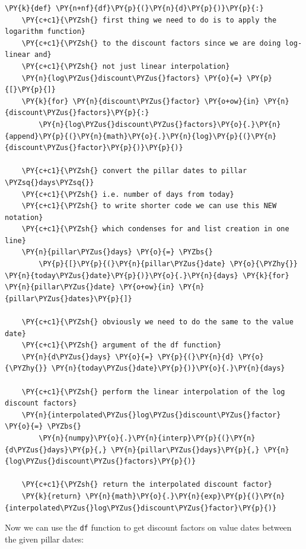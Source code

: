 \begin{tcolorbox}[breakable, size=fbox, boxrule=1pt, pad at break*=1mm,colback=cellbackground, colframe=cellborder]
\begin{Verbatim}[commandchars=\\\{\}]
\PY{k}{def} \PY{n+nf}{df}\PY{p}{(}\PY{n}{d}\PY{p}{)}\PY{p}{:}
    \PY{c+c1}{\PYZsh{} first thing we need to do is to apply the logarithm function}
    \PY{c+c1}{\PYZsh{} to the discount factors since we are doing log-linear and}
    \PY{c+c1}{\PYZsh{} not just linear interpolation}
    \PY{n}{log\PYZus{}discount\PYZus{}factors} \PY{o}{=} \PY{p}{[}\PY{p}{]}
    \PY{k}{for} \PY{n}{discount\PYZus{}factor} \PY{o+ow}{in} \PY{n}{discount\PYZus{}factors}\PY{p}{:}
        \PY{n}{log\PYZus{}discount\PYZus{}factors}\PY{o}{.}\PY{n}{append}\PY{p}{(}\PY{n}{math}\PY{o}{.}\PY{n}{log}\PY{p}{(}\PY{n}{discount\PYZus{}factor}\PY{p}{)}\PY{p}{)}
    
    \PY{c+c1}{\PYZsh{} convert the pillar dates to pillar \PYZsq{}days\PYZsq{}}
    \PY{c+c1}{\PYZsh{} i.e. number of days from today}
    \PY{c+c1}{\PYZsh{} to write shorter code we can use this NEW notation}
    \PY{c+c1}{\PYZsh{} which condenses for and list creation in one line}
    \PY{n}{pillar\PYZus{}days} \PY{o}{=} \PYZbs{}
        \PY{p}{[}\PY{p}{(}\PY{n}{pillar\PYZus{}date} \PY{o}{\PYZhy{}} \PY{n}{today\PYZus{}date}\PY{p}{)}\PY{o}{.}\PY{n}{days} \PY{k}{for} \PY{n}{pillar\PYZus{}date} \PY{o+ow}{in} \PY{n}{pillar\PYZus{}dates}\PY{p}{]}
    
    \PY{c+c1}{\PYZsh{} obviously we need to do the same to the value date}
    \PY{c+c1}{\PYZsh{} argument of the df function}
    \PY{n}{d\PYZus{}days} \PY{o}{=} \PY{p}{(}\PY{n}{d} \PY{o}{\PYZhy{}} \PY{n}{today\PYZus{}date}\PY{p}{)}\PY{o}{.}\PY{n}{days}
    
    \PY{c+c1}{\PYZsh{} perform the linear interpolation of the log discount factors}
    \PY{n}{interpolated\PYZus{}log\PYZus{}discount\PYZus{}factor} \PY{o}{=} \PYZbs{}
        \PY{n}{numpy}\PY{o}{.}\PY{n}{interp}\PY{p}{(}\PY{n}{d\PYZus{}days}\PY{p}{,} \PY{n}{pillar\PYZus{}days}\PY{p}{,} \PY{n}{log\PYZus{}discount\PYZus{}factors}\PY{p}{)}
    
    \PY{c+c1}{\PYZsh{} return the interpolated discount factor}
    \PY{k}{return} \PY{n}{math}\PY{o}{.}\PY{n}{exp}\PY{p}{(}\PY{n}{interpolated\PYZus{}log\PYZus{}discount\PYZus{}factor}\PY{p}{)}
\end{Verbatim}
\end{tcolorbox}

Now we can use the \texttt{df} function to get discount factors on value dates between the given pillar dates:

